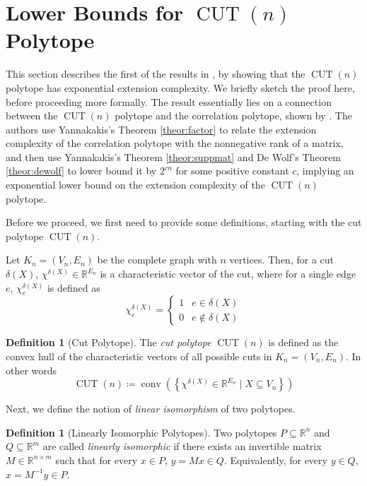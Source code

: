 \documentclass{article}
\theoremstyle{definition}
\newtheorem{definition}[theorem]{Definition}
\theoremstyle{remark}
\newcommand{\conv}{\operatorname{conv}}
\newcommand{\CUT}{\operatorname{CUT}}
\renewcommand{\R}{\mathbb{R}}
\begin{document}
\section{Lower Bounds for $\CUT(n)$ Polytope}\label{sec:cut-polytope}

This section describes the first of the results in \cite{fiorini}, by showing that the $\CUT(n)$ polytope has exponential extension complexity. We briefly sketch the proof here, before proceeding more formally. The result essentially lies on a connection between the $\CUT(n)$ polytope and the correlation polytope, shown by \cite{de-simone}. The authors use Yannakakis's Theorem \ref{theor:factor} to relate the extension complexity of the correlation polytope with the nonnegative rank of a matrix, and then use Yannakakis's Theorem \ref{theor:suppmat} and De Wolf's Theorem \ref{theor:dewolf} to lower bound it by $2^{cn}$ for some positive constant $c$, implying an exponential lower bound on the extension complexity of the $\CUT(n)$ polytope.

Before we proceed, we first need to provide some definitions, starting with the cut polytope $\CUT(n)$.

Let $K_n = (V_n, E_n)$ be the complete graph with $n$ vertices. Then, for a cut $\delta(X)$, $\chi^{\delta(X)} \in \R^{E_n}$ is a characteristic vector of the cut, where for a single edge $e$, $\chi^{\delta(X)}_e$ is defined as
\[
\chi^{\delta(X)}_e =
\begin{cases}
1 & e \in \delta(X) \\
0 & e \notin \delta(X)
\end{cases}
\]

\begin{definition}[Cut Polytope]\label{def:cut-poly}
The \textit{cut polytope} $\CUT(n)$ is defined as the convex hull of the characteristic vectors of all possible cuts in $K_n = (V_n, E_n)$. In other words
\[
\CUT(n) \coloneqq \conv\left( \left\{ \chi^{\delta(X)} \in \R^{E_n} \mid X \subseteq V_n \right\} \right)
\]
\end{definition}

Next, we define the notion of \textit{linear isomorphism} of two polytopes.

\begin{definition}[Linearly Isomorphic Polytopes]\label{def:lin-iso}
Two polytopes $P \subseteq \R^n$ and $Q \subseteq \R^m$ are called \textit{linearly isomorphic} if there exists an invertible matrix $M \in \R^{n \times m}$ such that for every $x \in P$, $y = Mx \in Q$. Equivalently, for every $y \in Q$, $x = M^{-1}y \in P$.
\end{definition}
\end{document}
